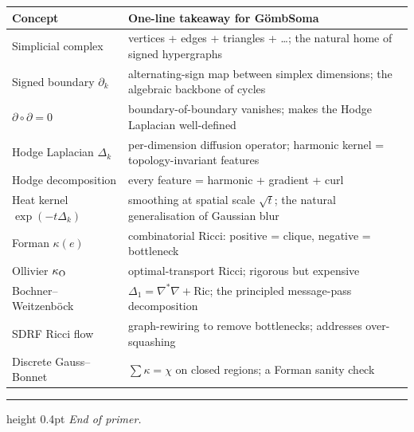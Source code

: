 \documentclass[11pt,a4paper]{article}
\begin{document}
\begin{center}
\begin{tabular}{lp{10cm}}
\toprule
Concept & One-line takeaway for G\"ombSoma\\
\midrule
Simplicial complex     & vertices + edges + triangles + \ldots; the natural home of signed hypergraphs \\
Signed boundary $\partial_k$ & alternating-sign map between simplex dimensions; the algebraic backbone of cycles \\
$\partial \circ \partial = 0$ & boundary-of-boundary vanishes; makes the Hodge Laplacian well-defined \\
Hodge Laplacian $\Delta_k$ & per-dimension diffusion operator; harmonic kernel = topology-invariant features \\
Hodge decomposition    & every feature = harmonic + gradient + curl \\
Heat kernel $\exp(-t\Delta_k)$ & smoothing at spatial scale $\sqrt{t}$; the natural generalisation of Gaussian blur \\
Forman $\kappa(e)$     & combinatorial Ricci: positive = clique, negative = bottleneck \\
Ollivier $\kappa_{\rm O}$ & optimal-transport Ricci; rigorous but expensive \\
Bochner--Weitzenböck   & $\Delta_1 = \nabla^* \nabla + \mathrm{Ric}$; the principled message-pass decomposition \\
SDRF Ricci flow        & graph-rewiring to remove bottlenecks; addresses over-squashing \\
Discrete Gauss--Bonnet & $\sum \kappa = \chi$ on closed regions; a Forman sanity check \\
\bottomrule
\end{tabular}
\end{center}

\vspace{1em}
\hrule height 0.4pt
\vspace{0.5em}
\emph{End of primer.}
\end{document}

